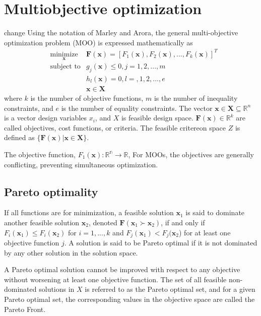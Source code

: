 \section{Multiobjective optimization}

change
Using the notation of Marley and Arora\cite{marler2004_moo_survey}, the general multi-objective optimization problem (MOO) is expressed mathematically as
\begin{align}
  & \underset{\bm{x}}{\text{minimize}}
        &\bm{F}(\bm{x}) = [ F_1(\bm{x}),
                            F_2(\bm{x}),
                            ...,
                            F_k(\bm{x})]^T\\
  & \text{subject to}
        &g_j(\bm{x}) \leq 0, j=1,2,...,m \\
  &     &h_l(\bm{x}) = 0, l=,1,2,...,e \\
  &     &\bm{x} \in \bm{X}
\end{align}
where $k$ is the number of objective functions, $m$ is the number of inequality constraints, and $e$ is the number of equality constraints.
The vector $\bm{x} \in \bm{X} \subseteq \mathbb{R}^n$ is a vector design variables $x_i$, and $X$ is feasible design space.
$\bm{F}(\bm{x}) \in \mathbb{R}^k$ are called objectives, cost functions, or criteria.  The feasible critereon space $Z$ is defined as
$\{\bm{F}(\bm{x}) | \bm{x} \in \bm{X} \}$.

The objective function,
    $F_1(\bm{x}):\mathbb{R^n} \rightarrow \mathbb{R}$,
For MOOs, the objectives are generally conflicting, preventing simultaneous optimization.

\subsection{Pareto optimality}

If all functions are for minimization, a feasible solution $\bm{x}_1$ is said to dominate another feasible solution $\bm{x}_2$, denoted $\bm{F}(\bm{x}_1 \succ \bm{x}_2)$, if and only if $F_i(\bm{x}_1)\leq F_i(\bm{x}_2)$ for $i = 1,...,k$ and $F_j(\bm{x}_1)< F_j(\bm{x}_2$) for at least one objective function $j$.  A solution is said to be Pareto optimal if it is not dominated by any other solution in the solution space.  

A Pareto optimal solution cannot be improved with respect to any objective without worsening at least one objective function.  The set of all feasible non-dominated solutions in $X$ is referred to as the Pareto optimal set, and for a given Pareto optimal set, the corresponding values in the objective space are called the Pareto Front.


